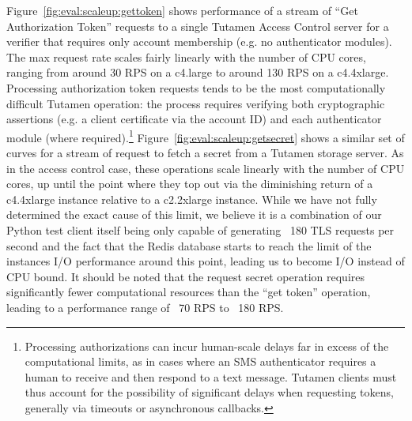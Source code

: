 Figure~\ref{fig:eval:scaleup:gettoken} shows performance of a stream
of ``Get Authorization Token'' requests to a single Tutamen Access
Control server for a verifier that requires only account membership
(e.g. no authenticator modules). The max request rate scales fairly
linearly with the number of CPU cores, ranging from around 30 RPS on a
c4.large to around 130 RPS on a c4.4xlarge. Processing authorization
token requests tends to be the most computationally difficult Tutamen
operation: the process requires verifying both cryptographic
assertions (e.g. a client certificate via the account ID) and each
authenticator module (where required).\footnote{Processing
  authorizations can incur human-scale delays far in excess of the
  computational limits, as in cases where an SMS authenticator
  requires a human to receive and then respond to a text
  message. Tutamen clients must thus account for the possibility of
  significant delays when requesting tokens, generally via timeouts or
  asynchronous callbacks.}  Figure~\ref{fig:eval:scaleup:getsecret}
shows a similar set of curves for a stream of request to fetch a
secret from a Tutamen storage server. As in the access control case,
these operations scale linearly with the number of CPU cores, up until
the point where they top out via the diminishing return of a
c4.4xlarge instance relative to a c2.2xlarge instance. While we have
not fully determined the exact cause of this limit, we believe it is a
combination of our Python test client itself being only capable of
generating ~180 TLS requests per second and the fact that the Redis
database starts to reach the limit of the instances I/O performance
around this point, leading us to become I/O instead of CPU bound. It
should be noted that the request secret operation requires
significantly fewer computational resources than the ``get token''
operation, leading to a performance range of ~70 RPS to ~180 RPS.

